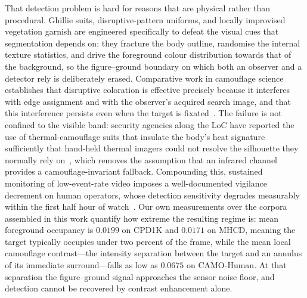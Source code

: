 \documentclass[3p,times,procedia]{elsarticle}
\begin{document}
That detection problem is hard for reasons that are physical rather than procedural. Ghillie suits, disruptive-pattern uniforms, and locally improvised vegetation garnish are engineered specifically to defeat the visual cues that segmentation depends on: they fracture the body outline, randomise the internal texture statistics, and drive the foreground colour distribution towards that of the background, so the figure--ground boundary on which both an observer and a detector rely is deliberately erased. Comparative work in camouflage science establishes that disruptive coloration is effective precisely because it interferes with edge assignment and with the observer's acquired search image, and that this interference persists even when the target is fixated~\cite{cuthill2019,troscianko2018}. The failure is not confined to the visible band: security agencies along the LoC have reported the use of thermal-camouflage suits that insulate the body's heat signature sufficiently that hand-held thermal imagers could not resolve the silhouette they normally rely on~\cite{tribune2018}, which removes the assumption that an infrared channel provides a camouflage-invariant fallback. Compounding this, sustained monitoring of low-event-rate video imposes a well-documented vigilance decrement on human operators, whose detection sensitivity degrades measurably within the first half hour of watch~\cite{warm2008}. Our own measurements over the corpora assembled in this work quantify how extreme the resulting regime is: mean foreground occupancy is $0.0199$ on CPD1K and $0.0171$ on MHCD, meaning the target typically occupies under two percent of the frame, while the mean local camouflage contrast---the intensity separation between the target and an annulus of its immediate surround---falls as low as $0.0675$ on CAMO-Human. At that separation the figure--ground signal approaches the sensor noise floor, and detection cannot be recovered by contrast enhancement alone.
\end{document}
